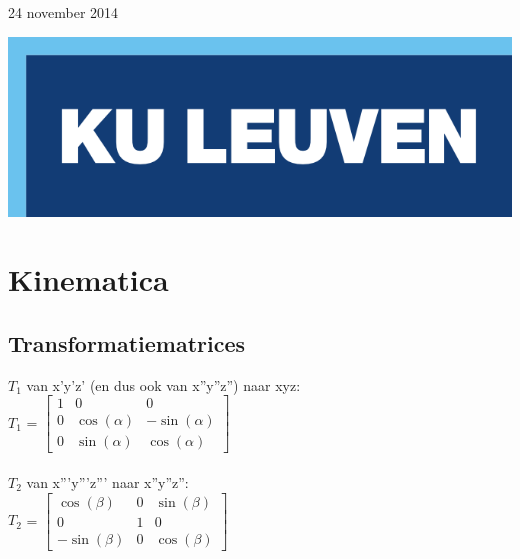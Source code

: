 \documentclass[a4paper,10pt]{article}
\begin{document}
\begin{titlepage}

{\large 24 november 2014}\\[3cm] %

\begin{center}
\includegraphics{Logo.png}\\[1cm] %
\end{center}

\vfill %

\end{titlepage}
\pagestyle{fancy}
\fancyhf{}
\fancyfoot[R]{\thepage}
\section{Kinematica}
\subsection{Transformatiematrices}
$T_{1}$ van x'y'z' (en dus ook van x''y''z'') naar xyz:\\
$T_{1}$ =
$\begin{bmatrix}
	1 & 0 & 0 \\
	0 & \cos(\alpha) & -\sin(\alpha) \\
	0 & \sin(\alpha) & \cos(\alpha)
\end{bmatrix}$\\\\
$T_{2}$ van x'''y'''z''' naar x''y''z'': \\
$T_{2}$ =
$\begin{bmatrix}
	\cos(\beta) & 0 & \sin(\beta) \\
	0 & 1 & 0 \\
	-\sin(\beta) & 0 & \cos(\beta)
\end{bmatrix}$
\end{document}
